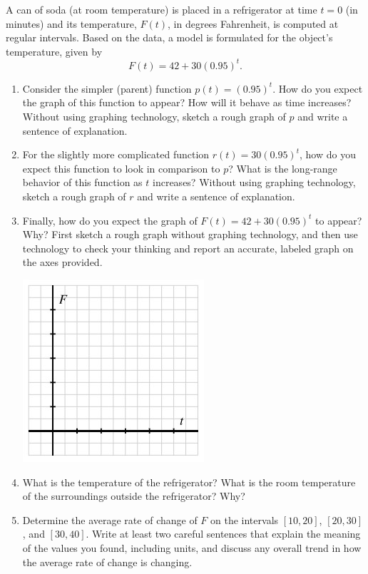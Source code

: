 \documentclass[nooutcomes]{ximera}
\begin{document}
\begin{exploration}
A can of soda (at room temperature) is placed in a refrigerator at time \(t = 0\) (in minutes) and its temperature, \(F(t)\), in degrees Fahrenheit, is computed at regular intervals. Based on the data, a model is formulated for the object's temperature, given by
\begin{equation*}
F(t) = 42 + 30(0.95)^{t}\text{.}
\end{equation*}
\begin{enumerate}[label=\alph*.]
\item Consider the simpler (parent) function \(p(t) = (0.95)^t\). How do you expect the graph of this function to appear? How will it behave as time increases? Without using graphing technology, sketch a rough graph of \(p\) and write a sentence of explanation.
\item For the slightly more complicated function \(r(t) = 30 (0.95)^{t}\), how do you expect this function to look in comparison to \(p\)?  What is the long-range behavior of this function as \(t\) increases? Without using graphing technology, sketch a rough graph of \(r\) and write a sentence of explanation.
\item Finally, how do you expect the graph of \(F(t) = 42 + 30(0.95)^{t}\) to appear? Why?  First sketch a rough graph without graphing technology, and then use technology to check your thinking and report an accurate, labeled graph on the axes provided.
\begin{image}
\includegraphics{ExpText11.jpg}
\end{image}
\item What is the temperature of the refrigerator? What is the room temperature of the surroundings outside the refrigerator? Why?
\item Determine the average rate of change of \(F\) on the intervals \([10,20]\), \([20,30]\), and \([30,40]\). Write at least two careful sentences that explain the meaning of the values you found, including units, and discuss any overall trend in how the average rate of change is changing.
\end{enumerate}
\end{exploration}
\end{document}
